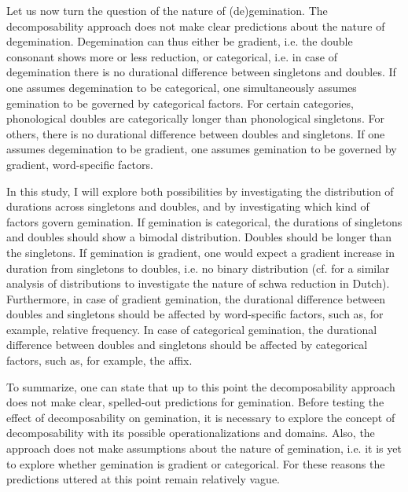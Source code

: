 {%
Let us now turn the question of the nature of (de)gemination. The decomposability approach does not make clear predictions about the nature of degemination. Degemination can thus either be gradient, i.e. the double consonant shows more or less reduction, or categorical, i.e. in case of degemination there is no durational difference between singletons and doubles. %
If one assumes degemination to be categorical, one simultaneously assumes gemination to be governed by categorical factors. For certain categories, phonological doubles are categorically longer than phonological singletons. For others, there is no durational difference between doubles and singletons. 
If one assumes degemination to be gradient, one assumes gemination to be governed by gradient, word-specific factors.

In this study, I will explore both possibilities by investigating the distribution of durations across singletons and doubles, and by investigating which kind of factors govern gemination. %
If gemination is categorical, the durations of singletons and doubles should show a bimodal distribution. Doubles should be longer than the singletons. If gemination is gradient, one would expect a gradient increase in duration from singletons to doubles, i.e. no binary distribution (cf.  \cite{Hanique.06.03.2013} for a similar analysis of distributions to investigate the nature of schwa reduction in Dutch). Furthermore, in case of gradient gemination, the durational difference between doubles and singletons should be affected by word-specific factors, such as, for example, relative frequency. In case of categorical gemination, the durational difference between doubles and singletons should be affected by categorical factors, such as, for example, the affix.
 


To summarize, one can state that up to this point the decomposability approach does not make clear, spelled-out predictions for gemination. Before testing the effect of decomposability on gemination, it is necessary to explore the concept of decomposability with its possible operationalizations and domains. Also, the approach does not make assumptions about the nature of gemination, i.e. it is yet to explore whether gemination is gradient or categorical. 
For these reasons the predictions uttered at this point remain relatively vague. 

}
